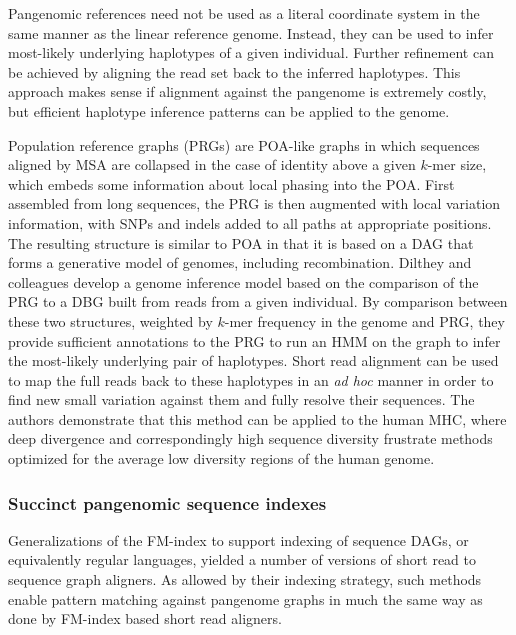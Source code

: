 Pangenomic references need not be used as a literal coordinate system in the same manner as the linear reference genome.
Instead, they can be used to infer most-likely underlying haplotypes of a given individual.
Further refinement can be achieved by aligning the read set back to the inferred haplotypes.
This approach makes sense if alignment against the pangenome is extremely costly, but efficient haplotype inference patterns can be applied to the genome.

Population reference graphs (PRGs) \cite{dilthey2015improved} are POA-like graphs in which sequences aligned by MSA are collapsed in the case of identity above a given $k$-mer size, which embeds some information about local phasing into the POA.
First assembled from long sequences, the PRG is then augmented with local variation information, with SNPs and indels added to all paths at appropriate positions.
The resulting structure is similar to POA in that it is based on a DAG that forms a generative model of genomes, including recombination.
Dilthey and colleagues develop a genome inference model based on the comparison of the PRG to a DBG built from reads from a given individual.
By comparison between these two structures, weighted by $k$-mer frequency in the genome and PRG, they provide sufficient annotations to the PRG to run an HMM on the graph to infer the most-likely underlying pair of haplotypes.
Short read alignment can be used to map the full reads back to these haplotypes in an \emph{ad hoc} manner in order to find new small variation against them and fully resolve their sequences.
The authors demonstrate that this method can be applied to the human MHC, where deep divergence and correspondingly high sequence diversity frustrate methods optimized for the average low diversity regions of the human genome.

\subsubsection{Succinct pangenomic sequence indexes}


Generalizations of the FM-index to support indexing of sequence DAGs, or equivalently regular languages, yielded a number of versions of short read to sequence graph aligners.
As allowed by their indexing strategy, such methods enable pattern matching against pangenome graphs in much the same way as done by FM-index based short read aligners.

